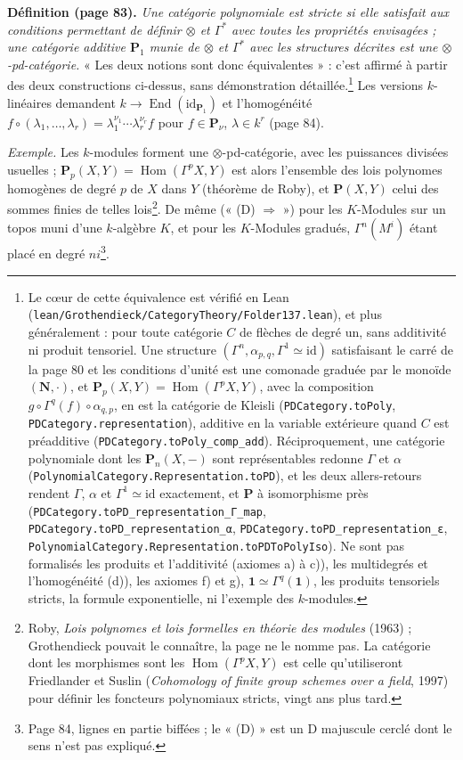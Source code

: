 \documentclass[11pt,a4paper]{article}
\begin{document}
\textbf{Définition (page 83).} \emph{Une catégorie polynomiale est
\emph{stricte} si elle satisfait aux conditions permettant de définir
$\otimes$ et $\Gamma^{*}$ avec toutes les propriétés envisagées ; une
catégorie additive $\mathbf{P}_{1}$ munie de $\otimes$ et $\Gamma^{*}$ avec
les structures décrites est une $\otimes$-pd-catégorie.} « Les deux notions
sont donc équivalentes » : c'est affirmé à partir des deux constructions
ci-dessus, sans démonstration détaillée.\footnote{Le cœur de cette équivalence est
vérifié en Lean (\texttt{lean/Grothendieck/CategoryTheory/Folder137.lean}), et plus
généralement : pour toute catégorie $C$ de flèches de degré un, sans additivité
ni produit tensoriel. Une structure $(\Gamma^{n}, \alpha_{p,q}, \Gamma^{1} \simeq
\mathrm{id})$ satisfaisant le carré de la page 80 et les conditions d'unité est
une comonade graduée par le monoïde $(\mathbf{N}, \cdot)$, et $\mathbf{P}_{p}(X,
Y) = \operatorname{Hom}(\Gamma^{p}X, Y)$, avec la composition $g \circ
\Gamma^{q}(f) \circ \alpha_{q,p}$, en est la catégorie de Kleisli
(\texttt{PDCategory.toPoly}, \texttt{PDCategory.representation}), additive en la
variable extérieure quand $C$ est préadditive (\texttt{PDCategory.toPoly\_comp\_add}).
Réciproquement, une catégorie polynomiale dont les $\mathbf{P}_{n}(X, -)$ sont
représentables redonne $\Gamma$ et $\alpha$
(\texttt{PolynomialCategory.Representation.toPD}), et les deux allers-retours
rendent $\Gamma$, $\alpha$ et $\Gamma^{1} \simeq \mathrm{id}$ exactement, et
$\mathbf{P}$ à isomorphisme près (\texttt{PDCategory.toPD\_representation\_Γ\_map},
\texttt{PDCategory.toPD\_representation\_α},
\texttt{PDCategory.toPD\_representation\_ε},
\texttt{PolynomialCategory.Representation.toPDToPolyIso}). Ne sont pas formalisés les produits et
l'additivité (axiomes a) à c)), les multidegrés et l'homogénéité (d)), les
axiomes f) et g), $\mathbf{1} \simeq \Gamma^{q}(\mathbf{1})$, les produits
tensoriels stricts, la formule exponentielle, ni l'exemple des $k$-modules.} Les versions $k$-linéaires demandent
$k \to \operatorname{End}(\mathrm{id}_{\mathbf{P}_{1}})$ et l'homogénéité
$f \circ (\lambda_{1}, \ldots, \lambda_{r}) = \lambda_{1}^{\nu_{1}} \cdots
\lambda_{r}^{\nu_{r}} f$ pour $f \in \mathbf{P}_{\nu}$, $\lambda \in k^{r}$
(page 84).

\emph{Exemple.} Les $k$-modules forment une $\otimes$-pd-catégorie, avec les
puissances divisées usuelles ; $\mathbf{P}_{p}(X, Y) = \operatorname{Hom}(\Gamma^{p}X,
Y)$ est alors l'ensemble des lois polynomes homogènes de degré $p$ de $X$
dans $Y$ (théorème de Roby), et $\mathbf{P}(X, Y)$ celui des sommes finies de
telles lois\footnote{Roby, \emph{Lois polynomes et lois formelles en théorie
des modules} (1963) ; Grothendieck pouvait le connaître, la page ne le
nomme pas. La catégorie dont les morphismes sont les
$\operatorname{Hom}(\Gamma^{p}X, Y)$ est celle qu'utiliseront Friedlander
et Suslin (\emph{Cohomology of finite group schemes over a field}, 1997)
pour définir les foncteurs polynomiaux stricts, vingt ans plus tard.}. De
même (« (D) $\Rightarrow$ ») pour les $K$-Modules sur un topos muni d'une
$k$-algèbre $K$, et pour les $K$-Modules gradués, $\Gamma^{n}(M^{i})$ étant
placé en degré $ni$\footnote{Page 84, lignes en partie biffées ; le « (D) »
est un D majuscule cerclé dont le sens n'est pas expliqué.}.
\end{document}
